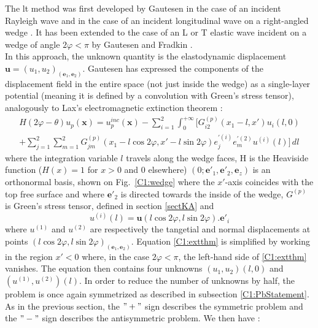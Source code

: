 The \acrfull{lt} method was first developed by Gautesen in the case of an incident Rayleigh wave \cite{GautesenRayleigh,GautesenRayleigh2,GautesenRayleigh0,GautesenRayleigh4,GautesenRayleigh3} and in the case of an incident longitudinal wave on a right-angled wedge \cite{GautesenLwave}. It has been extended to the case of an L or T elastic wave incident on a wedge of angle $2\varphi<\pi$ by Gautesen and Fradkin \cite{GautesenFradkin}.\\
\hspace*{1em} In this approach, the unknown quantity is the elastodynamic displacement $\mathbf{u}=(u_1,u_2)_{(\mathbf{e}_1,\mathbf{e}_2)}$. Gautesen \cite{GautesenRayleigh} has expressed the components of the displacement field in the entire space (not just inside the wedge) as a single-layer potential (meaning it is defined by a convolution with Green's stress tensor), analogously to Lax's electromagnetic extinction theorem \cite{Lax} :
\begin{multline}
H(2\varphi-\theta)u_p(\mathbf{x})=u_p^{inc}(\mathbf{x})-\sum_{i=1}^2\int_0^{+\infty}\Big[ G_{i2}^{(p)}(x_1-l,x')u_i(l,0) \\
 +\sum_{j=1}^2\sum_{m=1}^2G_{jm}^{(p)}(x_1-l\cos 2\varphi,x'-l\sin 2\varphi)e_j^{\prime (i)}e_m^{\prime (2)}u^{(i)}(l) \Big] \, dl
 \label{C1:extthm}
\end{multline}
where the integration variable $l$ travels along the wedge faces, H is the Heaviside function ($H(x)=1$ for $x>0$ and $0$ elsewhere) $(0;\mathbf{e}'_1,\mathbf{e}'_2, \mathbf{e}_z)$ is an orthonormal basis, shown on Fig.~\ref{C1:wedge} where the $x'$-axis coincides with the top free surface and where $\mathbf{e}'_2$ is directed towards the inside of the wedge, $G^{(p)}$ is Green's stress tensor, defined in section \ref{sectKA} and
\begin{equation}
u^{(i)}(l)=\mathbf{u}(l\cos 2\varphi,l\sin 2\varphi).\mathbf{e}'_i 
\end{equation}
where $u^{(1)}$ and $u^{(2)}$ are respectively the tangetial and normal displacements at points $(l\cos 2\varphi,l\sin 2\varphi)_{(\mathbf{e}_1,\mathbf{e}_2)}$. Equation \eqref{C1:extthm} is simplified by working in the region $x'<0$ where, in the case $2\varphi<\pi$, the left-hand side of \eqref{C1:extthm} vanishes. The equation then contains four unknowns $(u_1,u_2)(l,0)$ and $(u^{(1)},u^{(2)})(l)$. In order to reduce the number of unknowns by half, the problem is once again symmetrized as described in subsection \ref{C1:PbStatement}. As in the previous section, the $"+"$ sign describes the symmetric problem and the $"-"$ sign describes the antisymmetric problem. We then have :
